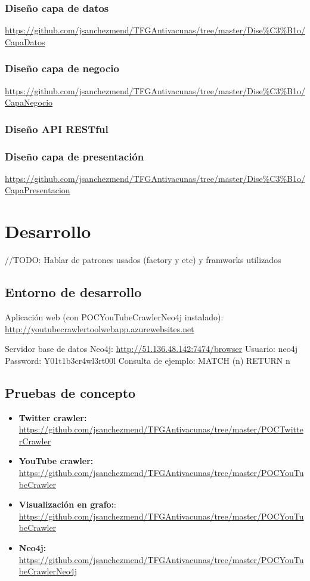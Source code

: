 \documentclass[11pt,a4paper]{article}
\begin{document}
\subsubsection{Diseño capa de datos}
\url{https://github.com/jsanchezmend/TFGAntivacunas/tree/master/Dise%C3%B1o/CapaDatos}

\subsubsection{Diseño capa de negocio}
\url{https://github.com/jsanchezmend/TFGAntivacunas/tree/master/Dise%C3%B1o/CapaNegocio}

\subsubsection{Diseño API RESTful}

\subsubsection{Diseño capa de presentación}
\url{https://github.com/jsanchezmend/TFGAntivacunas/tree/master/Dise%C3%B1o/CapaPresentacion}
\newpage 




\section{Desarrollo}
//TODO: Hablar de patrones usados (factory y etc) y framworks utilizados
\subsection{Entorno de desarrollo}
Aplicación web (con POCYouTubeCrawlerNeo4j instalado):
\url{http://youtubecrawlertoolwebapp.azurewebsites.net} 

Servidor base de datos Neo4j:
\url{http://51.136.48.142:7474/browser} 
Usuario: neo4j
Password: Y01t1b3cr4wl3rt00l
Consulta de ejemplo: MATCH (n) RETURN n

\subsection{Pruebas de concepto}
\begin{itemize}
\item \textbf{Twitter crawler:} \url{https://github.com/jsanchezmend/TFGAntivacunas/tree/master/POCTwitterCrawler}
\item \textbf{YouTube crawler:} \url{https://github.com/jsanchezmend/TFGAntivacunas/tree/master/POCYouTubeCrawler}
\item \textbf{Visualización en grafo:}: \url{https://github.com/jsanchezmend/TFGAntivacunas/tree/master/POCYouTubeCrawler}
\item \textbf{Neo4j:} \url{https://github.com/jsanchezmend/TFGAntivacunas/tree/master/POCYouTubeCrawlerNeo4j}
\end{itemize}
\end{document}
